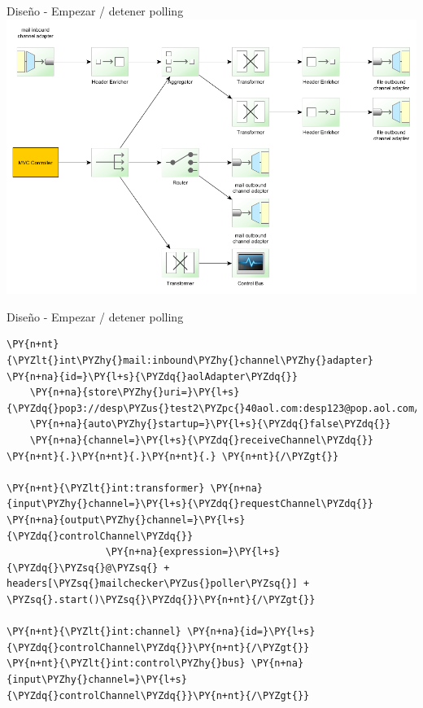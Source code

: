 \documentclass{beamer}
\begin{document}
\begin{frame}{Diseño - Empezar / detener polling}
\includegraphics[width=0.9\linewidth]{sp-int-14}
\end{frame}

\begin{frame}[fragile]{Diseño - Empezar / detener polling}
\begin{Verbatim}[fontsize=\tiny,commandchars=\\\{\}]
\PY{n+nt}{\PYZlt{}int\PYZhy{}mail:inbound\PYZhy{}channel\PYZhy{}adapter} \PY{n+na}{id=}\PY{l+s}{\PYZdq{}aolAdapter\PYZdq{}}
    \PY{n+na}{store\PYZhy{}uri=}\PY{l+s}{\PYZdq{}pop3://desp\PYZus{}test2\PYZpc{}40aol.com:desp123@pop.aol.com/INBOX\PYZdq{}}
    \PY{n+na}{auto\PYZhy{}startup=}\PY{l+s}{\PYZdq{}false\PYZdq{}}
    \PY{n+na}{channel=}\PY{l+s}{\PYZdq{}receiveChannel\PYZdq{}} \PY{n+nt}{.}\PY{n+nt}{.}\PY{n+nt}{.} \PY{n+nt}{/\PYZgt{}}

\PY{n+nt}{\PYZlt{}int:transformer} \PY{n+na}{input\PYZhy{}channel=}\PY{l+s}{\PYZdq{}requestChannel\PYZdq{}} \PY{n+na}{output\PYZhy{}channel=}\PY{l+s}{\PYZdq{}controlChannel\PYZdq{}}
                 \PY{n+na}{expression=}\PY{l+s}{\PYZdq{}\PYZsq{}@\PYZsq{} + headers[\PYZsq{}mailchecker\PYZus{}poller\PYZsq{}] + \PYZsq{}.start()\PYZsq{}\PYZdq{}}\PY{n+nt}{/\PYZgt{}}

\PY{n+nt}{\PYZlt{}int:channel} \PY{n+na}{id=}\PY{l+s}{\PYZdq{}controlChannel\PYZdq{}}\PY{n+nt}{/\PYZgt{}}
\PY{n+nt}{\PYZlt{}int:control\PYZhy{}bus} \PY{n+na}{input\PYZhy{}channel=}\PY{l+s}{\PYZdq{}controlChannel\PYZdq{}}\PY{n+nt}{/\PYZgt{}}
\end{Verbatim}
\end{frame}
\end{document}
